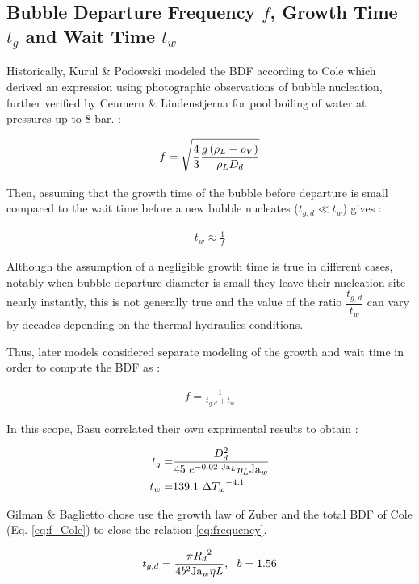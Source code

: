 \subsection{Bubble Departure Frequency $f$, Growth Time $t_{g}$ and Wait Time $t_{w}$}


Historically, Kurul \& Podowski modeled the BDF according to Cole \cite{cole} which derived an expression using photographic observations of bubble nucleation, further verified by Ceumern \& Lindenstjerna for pool boiling of water at pressures up to 8 bar. :

\begin{align}
f = \sqrt{\frac{4}{3} \frac{g \left( \rho_{L}-\rho_{V} \right)}{\rho_{L}D_{d}} }
\label{eq:f_Cole}
\end{align}

Then, assuming that the growth time of the bubble before departure is small compared to the wait time before a new bubble nucleates ($t_{g,d} \ll t_{w}$) gives :

\begin{align}
t_{w} \approx \frac{1}{f}
\end{align}


Although the assumption of a negligible growth time is true in different cases, notably when bubble departure diameter is small \ie they leave their nucleation site nearly instantly, this is not generally true and the value of the ratio $\dfrac{t_{g,d}}{t_{w}}$ can vary by decades depending on the thermal-hydraulics conditions.

Thus, later models considered separate modeling of the growth and wait time in order to compute the BDF as :

\begin{align}
f = \frac{1}{t_{g,d} + t_{w} }
\label{eq:frequency}
\end{align}


In this scope, Basu \etal \cite{basu} correlated their own exprimental results to obtain :

\begin{align}
t_{g} =& \frac{D_{d}^{2} }{45~e^{-0.02~\mathrm{Ja}_{L}} \eta_{L} \mathrm{Ja}_{w}} \label{eq:tg_Basu}
 \\
t_{w} =&  139.1\ {\Delta T_{w}}^{-4.1}
\label{eq:tw_Basu}
\end{align}


Gilman \& Baglietto \cite{gilman} chose use the growth law of Zuber \cite{zuber1961} and the total BDF of Cole (Eq. \ref{eq:f_Cole}) to close the relation \ref{eq:frequency}.

\begin{align}
t_{g,d} = \frac{\pi {R_{d}}^{2}}{4b^{2} \mathrm{Ja}_{w} \eta{L}},\ \ b=1.56
\end{align}